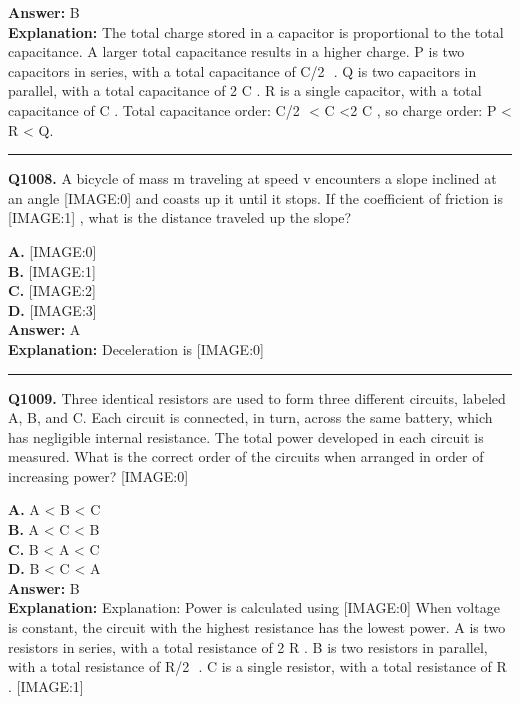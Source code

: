 \documentclass[12pt]{article}
\begin{document}
\textbf{Answer:} B \\
\textbf{Explanation:} The total charge stored in a capacitor is proportional to the total capacitance. A larger total capacitance results in a higher charge.
P
is two capacitors in series, with a total capacitance of
C/2
​
.
Q
is two capacitors in parallel, with a total capacitance of 2
C
.
R
is a single capacitor, with a total capacitance of
C
.
Total capacitance order:
C/2
​
<
C
<2
C
, so charge order: P < R < Q.

\hrule
\vspace{1em}


\noindent
\textbf{Q1008.} A bicycle of mass m
traveling at speed v
encounters a slope inclined at an angle
[IMAGE:0]
and coasts up it until it stops. If the coefficient of friction is
[IMAGE:1]
, what is the distance traveled up the slope?



\textbf{A.} [IMAGE:0] \\
\textbf{B.} [IMAGE:1] \\
\textbf{C.} [IMAGE:2] \\
\textbf{D.} [IMAGE:3] \\

\textbf{Answer:} A \\
\textbf{Explanation:} Deceleration is
[IMAGE:0]

\hrule
\vspace{1em}


\noindent
\textbf{Q1009.} Three identical resistors are used to form three different circuits, labeled A, B, and C. Each circuit is connected, in turn, across the same battery, which has negligible internal resistance. The total power developed in each circuit is measured. What is the correct order of the circuits when arranged in order of increasing power?
[IMAGE:0]



\textbf{A.} A < B < C \\
\textbf{B.} A < C < B \\
\textbf{C.} B < A < C \\
\textbf{D.} B < C < A \\

\textbf{Answer:} B \\
\textbf{Explanation:} Explanation:
Power is calculated using
[IMAGE:0]
When voltage is constant, the circuit with the highest resistance has the lowest power.
A
is two resistors in series, with a total resistance of 2
R
.
B
is two resistors in parallel, with a total resistance of
R/2
​
.
C
is a single resistor, with a total resistance of
R
.
[IMAGE:1]
\end{document}
